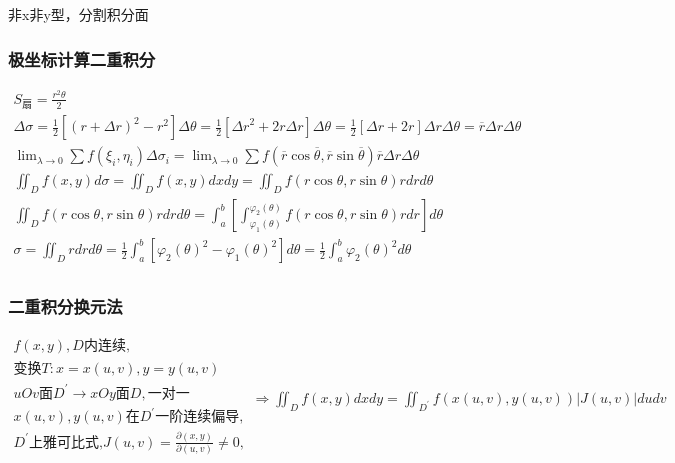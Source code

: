 \documentclass[UTF8]{ctexart}
\newcommand{\mt}[1]{\text{#1}}
\newcommand{\mf}[1]{\left( #1\right)}
\newcommand{\mfa}[1]{\left| #1\right|}
\newcommand{\mfc}[1]{\left[ #1 \right]}
\newcommand{\p}{\par}
\newcommand{\ma}[1]{\begin{array}{llll} #1 \end{array}}
\newcommand{\da}[2]{\frac{\partial #1}{\partial #2}}
\begin{document}
非x非y型，分割积分面\p

\subsubsection{极坐标计算二重积分}
$\ma{S_{\mt{扇}}=\frac{r^2\theta}{2}\\
\Delta \sigma = \frac{1}{2}\mfc{\mf{r+\Delta r}^2-r^2}\Delta \theta=\frac{1}{2}\mfc{ {\Delta r}^2 +2r\Delta r}\Delta \theta=
\frac{1}{2}\mfc{ {\Delta r} +2r } \Delta r \Delta \theta=\overline{r}\Delta r \Delta \theta \\
\lim_{\lambda \rightarrow 0}\sum f\mf{\xi_i,\eta_i}\Delta \sigma _i=\lim_{\lambda \rightarrow 0 }\sum f\mf{\overline{r}\cos \overline{\theta},\overline{r} \sin \overline{\theta}}\overline{r}\Delta r \Delta \theta\\
\iint_D f\mf{x,y}d \sigma=\iint_D f\mf{x,y}dxdy=\iint_D f\mf{r\cos \theta,r \sin \theta}rdrd\theta\\
\iint_D f\mf{r\cos \theta,r \sin \theta}rdrd\theta=\int_a^b \mfc{\int_{\varphi_1\mf{\theta}}^{\varphi_2\mf{\theta}} f\mf{r\cos \theta,r \sin \theta}rdr} d\theta\\
\sigma=\iint_Drdrd\theta=\frac{1}{2}\int_a^b\mfc{{\varphi_2\mf{\theta}}^2-{\varphi_1\mf{\theta}}^2 }d\theta = 
\frac{1}{2}\int_a^b{\varphi_2\mf{\theta}}^2  d\theta\\
}$

 
\subsubsection{二重积分换元法}

$\ma{f\mf{x,y},D\mt{内连续},\\
    \mt{变换}T: x=x\mf{u,v},y=y\mf{u,v}\\
    uOv\mt{面}D^{'}\rightarrow xOy\mt{面}D,\mt{一对一}\\
    x\mf{u,v},y\mf{u,v}\mt{在}D^{'}\mt{一阶连续偏导},\\
    D^{'}\mt{上雅可比式,}J\mf{u,v}=\da{\mf{x,y}}{\mf{u,v}}\neq 0,\\
}\Rightarrow \iint_Df\mf{x,y}dxdy=\iint_{D^{'}}f\mf{x\mf{u,v},y\mf{u,v}}\mfa{J\mf{u,v}}dudv
$
\end{document}
